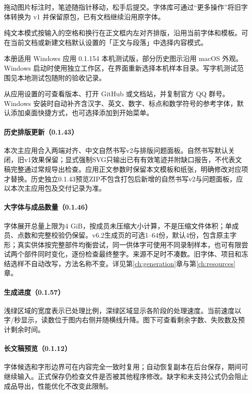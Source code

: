 拖动图片标注时，笔迹随指针移动，松手后提交。字体库可通过“更多操作”将旧字体转换为 v1 并保留原包，已有文档继续沿用原字体。

纯文本模式按输入的空格和换行在正文框内左对齐排版，沿用当前字体和模板。可在当前文档或新建文档默认设置的「正文与段落」中选择内容模式。

本册适用 Windows 应用 0.1.154 本机测试版，部分历史图示沿用 macOS 外观。Windows 启动时使用独立工作区，在界面重新选择本机样本目录。写字机测试范围见本地测试包随附的验收记录。

从应用设置的可查看版本、打开 GitHub 或文档站，并复制官方 QQ 群号。Windows 安装时自动补齐含汉字、英文、数字、标点和数学符号的参考字体，默认添加桌面快捷方式，也可选择添加到开始菜单。

\paragraph{历史排版更新（0.1.43）}本次主应用合入两端对齐、中文自然书写v2与排版问题面板。自然书写默认关闭，旧v1效果保留；显式强制SVG只输出已有有效笔迹并附缺口报告，不代表文稿完整通过常规导出检查。应用正文参数时保留本文模板和纸张，明确修改对应项才替换。历史独立0.1.43预览ZIP不包含打包后新增的自然书写v2与问题面板，应以本次主应用包及交付记录为准。

\paragraph{大字体与成品数量（0.1.46）}字体展开总量上限为4 GiB，按成员未压缩大小计算，不是压缩文件体积；单成员、点数和完整校验仍保留。v6.2生成页的可选1--64份，默认4份，包含原主字形；真实供体按完整部件均衡尝试，同一供体字可使用不同录制样本，也可有限尝试两个部件同时变化，逐份检查最终整字。来源不足时不凑数。旧字体、项目和冻结选样不自动改写，方法名称不变。详见第\ref{ch:generation}章与第\ref{ch:resources}章。

\paragraph{生成进度（0.1.57）}浅绿区域的宽度表示已处理比例，深绿区域显示各阶段的处理速度。当前速度以字/秒显示，读数位于图内右侧并随横线升降。图下可查看剩余字数、失败数及预计剩余时间。

\paragraph{长文稿预览（0.1.12）}字体候选和字形边界可在内容完全一致时复用；自动恢复副本在后台保存，期间可继续输入。正式保存仍检查文件是否被其他程序修改。缺字和未支持公式仍会阻止成品导出，性能优化不改变此限制。


